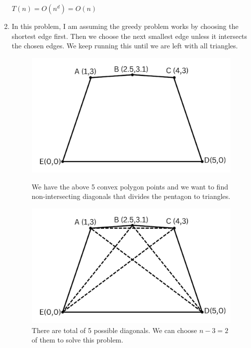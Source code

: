 \documentclass{article}
\begin{document}
\begin{enumerate}
  \begin{center}
    $T(n)=O(n^d)=O(n)$
  \end{center}
  
  \item In this problem, I am assuming the greedy problem works by choosing the shortest edge first.
  Then we choose the next smallest edge unless it intersects the chosen edges.
  We keep running this until we are left with all triangles.

  \begin{figure}[H]
    \centering
    \begin{minipage}{0.4\textwidth}
      \centering
      \includegraphics[width=\textwidth]{image1.png}
      \caption{We have the above 5 convex polygon points and we want to find non-intersecting diagonals that divides the pentagon to triangles.}
    \end{minipage}
    \hspace{1cm}
    \begin{minipage}{0.4\textwidth}
      \centering
      \includegraphics[width=\textwidth]{image2.png}
      \caption{There are total of 5 possible diagonals. We can choose $n-3=2$ of them to solve this problem.}
    \end{minipage}
  \end{figure}


\end{enumerate}
\end{document}
